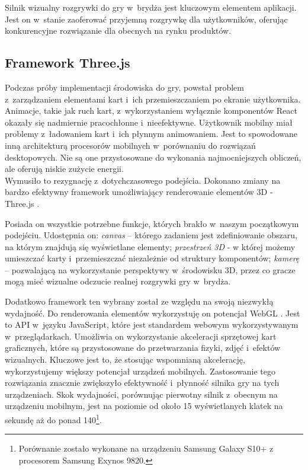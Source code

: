 Silnik wizualny rozgrywki do gry w~brydża jest kluczowym elementem aplikacji.
Jest on w~stanie zaoferować przyjemną rozgrywkę dla
użytkowników, oferując konkurencyjne rozwiązanie dla obecnych na rynku produktów.

\subsection{Framework Three.js}
Podczas próby implementacji środowiska do gry, powstał problem z~zarządzaniem
elementami kart i~ich przemieszczaniem po ekranie użytkownika. Animacje,
takie jak ruch kart, z~wykorzystaniem wyłącznie komponentów React
okazały się nadmiernie pracochłonne i~nieefektywne. Użytkownik
mobilny miał problemy z~ładowaniem kart
i~ich płynnym animowaniem. Jest to spowodowane inną architekturą procesorów
mobilnych w~porównaniu do rozwiązań desktopowych. Nie są one przystosowane
do wykonania najmocniejszych obliczeń, ale oferują niskie zużycie energii. \\

Wymusiło to rezygnację z~dotychczasowego podejścia. Dokonano zmiany na bardzo
efektywny framework umożliwiający renderowanie elementów 3D - Three.js
\cite{ThreeJS}.

Posiada on wszystkie potrzebne funkcje, których brakło w~naszym początkowym
podejściu. Udostępnia on:
\textit{canvas} -- którego zadaniem jest zdefiniowanie
obszaru, na którym znajdują się wyświetlane elementy;
\textit{przestrzeń 3D} - w której możemy umieszczać
karty i~przemieszczać niezależnie od struktury komponentów;
\textit{kamerę} -- pozwalającą na wykorzystanie perspektywy
w~środowisku 3D, przez co gracze mogą mieć wizualne
odczucie realnej rozgrywki gry w~brydża.


Dodatkowo framework ten wybrany został ze względu na swoją niezwykłą wydajność.
Do renderowania elementów wykorzystuję on potencjał WebGL \cite{WebGL}.
Jest to API
w~języku JavaScript, które jest standardem webowym wykorzystywanym
w~przeglądarkach. Umożliwia on wykorzystanie akceleracji sprzętowej kart
graficznych, które są przystosowane do przetwarzania fizyki, zdjęć
i~efektów wizualnych. Kluczowe jest to, że stosując wspomnianą akcelerację,
wykorzystujemy większy potencjał urządzeń mobilnych. Zastosowanie tego rozwiązania
znacznie zwiększyło efektywność i~płynność silnika gry na tych urządzeniach.
Skok wydajności, porównując pierwotny silnik z~obecnym na urządzeniu mobilnym,
jest na poziomie od około 15 wyświetlanych klatek na sekundę aż do
ponad 140\footnote{
  Porównanie zostało wykonane na urządzeniu
  Samsung Galaxy S10+ z procesorem Samsung Exynos 9820.
}.


